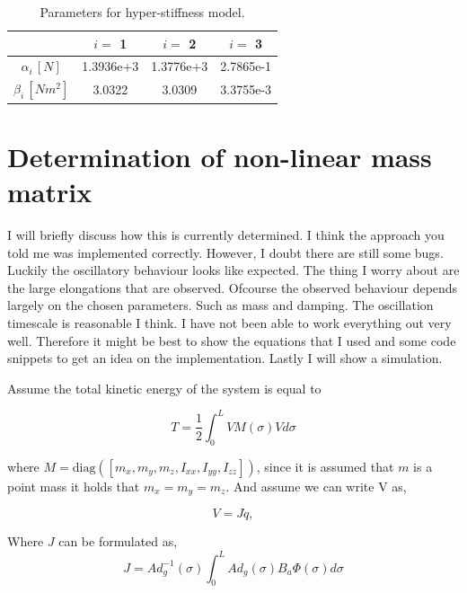 \begin{table}[H]
    \centering
        \caption{Parameters for hyper-stiffness model.}
\begin{tabular}{|c|c|c|c|} \hline
            &  $i = $ 1      &    $i = $    2   &  $i = $ 3  \\ \hline
   $\alpha_i \hspace{2pt}[N]$    &    1.3936e+3    & 1.3776e+3    & 2.7865e-1 \\ \hline
   $\beta_i \hspace{2pt}  [Nm^2] $     &  3.0322 & 3.0309    &  3.3755e-3\\ \hline
\end{tabular}
\end{table}


\section{Determination of non-linear mass matrix}

I will briefly discuss how this is currently determined. I think the approach you told me was implemented correctly. However, I doubt there are still some bugs. Luckily the oscillatory behaviour looks like expected. The thing I worry about are the large elongations that are observed. Ofcourse the observed behaviour depends largely on the chosen parameters. Such as mass and damping. The oscillation timescale is reasonable I think.  I have not been able to work everything out very well. Therefore it might be best to show the equations that I used and some code snippets to get an idea on the implementation. Lastly I will show a simulation.

Assume the total kinetic energy of the system is equal to 

\begin{equation}
    T = \frac{1}{2} \int_0^L VM(\sigma)V d\sigma
\end{equation}

where $M = \text{diag}([m_x,m_y,m_z,I_{xx},I_{yy},I_{zz}])$, since it is assumed that $m$ is a point mass it holds that $m_x=m_y=m_z$. And assume we can write V as,

\begin{equation}
    V = J\dot{q},
\end{equation}

Where $J$ can be formulated as,
\begin{equation}
    J = Ad_g^{-1}(\sigma) \int_0^L Ad_g(\sigma) B_a\Phi(\sigma)d\sigma
\end{equation}

